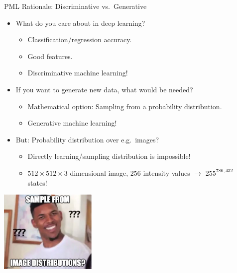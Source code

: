\begin{frame}{PML Rationale: Discriminative vs.\ Generative}
    \begin{itemize}
    \item What do you care about in deep learning? 
    \begin{itemize}
        \pause \item Classification/regression accuracy.
        \pause \item Good features.
    \pause \item Discriminative machine learning!
    \end{itemize}
    \pause \item If you want to generate new data, what would be needed? 
    \begin{itemize}
        \pause \item Mathematical option: Sampling from a probability distribution.
    \pause \item Generative machine learning!
    \end{itemize}
    \pause \item But: Probability distribution over e.g.\ images? 
    \begin{itemize}
        \pause \item Directly learning/sampling distribution is impossible!
        \pause \item $512 \times 512 \times 3$ dimensional image, $256$ intensity values \pause $\rightarrow$ $255^{786,432}$ states!
    \end{itemize}
\end{itemize}
\begin{center}

\pause 
\includegraphics[width=0.35\textwidth]{img/sample_from_image_distributions.jpeg}
\end{center}
\end{frame}
%
